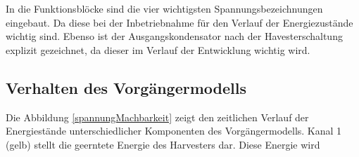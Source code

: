 
In die Funktionsblöcke sind die vier wichtigsten Spannungsbezeichnungen eingebaut. Da diese bei der Inbetriebnahme für den Verlauf der Energiezustände wichtig sind. Ebenso ist der Ausgangskondensator nach der Havesterschaltung explizit gezeichnet, da dieser im Verlauf der Entwicklung wichtig wird. %

 

\subsection{Verhalten des Vorgängermodells}

Die Abbildung \ref{spannungMachbarkeit} zeigt den zeitlichen Verlauf der Energiestände unterschiedlicher Komponenten des Vorgängermodells. Kanal 1 (gelb) stellt die geerntete Energie des Harvesters dar. Diese Energie wird 

%

